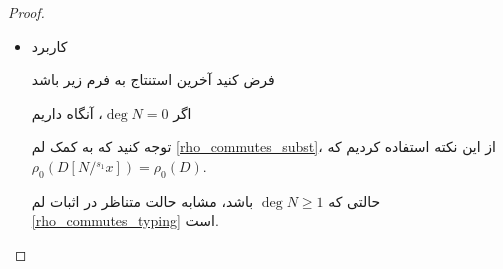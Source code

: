 \begin{proof}
\begin{itemize}
فرض کنید آخرین استنتاج به فرم زیر باشد
\begin{prooftree}
\end{prooftree}
مشابه مورد متناظر در اثبات لم
\ref{rho_commutes_typing}،
داریم
\begin{equation*}
\rho_0(\Gamma) \vdash (\lambda x^{\rho_{i-1}(C)} \dots \lambda x^{\rho_{0}(C)}.\gamma(D)) : (\Pi x^{\rho_{i-1}(C)} \dots \Pi x^{\rho_{0}(C)}.\rho_0(D))
\end{equation*}
و به کمک تضعیف، برای یک متغیر جدید
$z$
داریم
\begin{equation*}
\rho_0(\Gamma), z : 0 \vdash (\lambda x^{\rho_{i-1}(C)} \dots \lambda x^{\rho_{0}(C)}.\gamma(D)) : (\Pi x^{\rho_{i-1}(C)} \dots \Pi x^{\rho_{0}(C)}.\rho_0(D))
\end{equation*}
بنابراین
\begin{prooftree}
\end{prooftree}
پس با استفاده از انتزاع و کاربرد می‌توانیم بنویسیم
\begin{equation*}
\rho_0(\Gamma) \vdash ((\lambda z^0.\lambda x^{\rho_{i-1}(C)} \dots \lambda x^{\rho_{0}(C)}.\gamma(D))\gamma(C)) : (\Pi x^{\rho_{i-1}(C)} \dots \Pi x^{\rho_{0}(C)}.\rho_0(D))
\end{equation*}

\item کاربرد

فرض کنید آخرین استنتاج به فرم زیر باشد
\begin{prooftree}
\end{prooftree}
اگر
$\operatorname{deg} N = 0$،
آنگاه داریم
\begin{prooftree}
\end{prooftree}
توجه کنید که به کمک لم
\ref{rho_commutes_subst}،
از این نکته استفاده کردیم که
$\rho_0(D[N/{}^{s_{1}}x]) = \rho_0(D)$.

حالتی که
$\operatorname{deg} N \ge 1$
باشد، مشابه حالت متناظر در اثبات لم
\ref{rho_commutes_typing}
است.


\end{itemize}
\end{proof}
